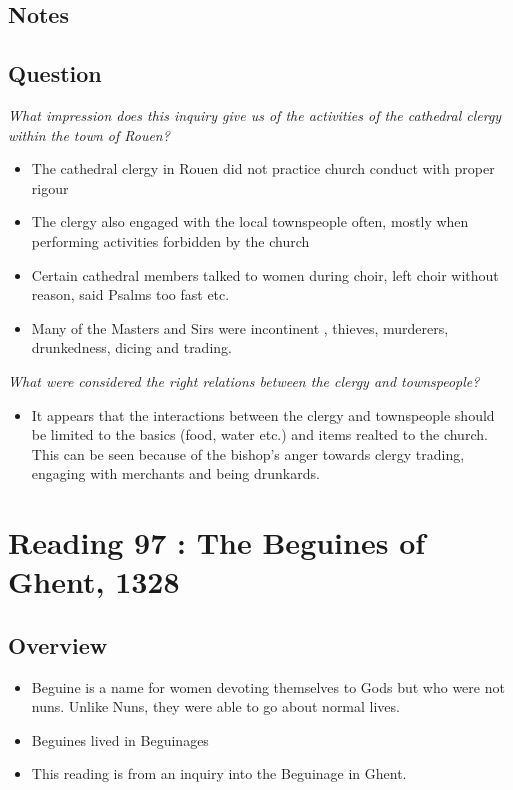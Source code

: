 \documentclass[12pt]{article}
\begin{document}
\subsection*{Notes}

\subsection*{Question}

\textit{What impression does this inquiry give us of the activities of the cathedral clergy within the town of Rouen?}

\begin{itemize}
	\item The cathedral clergy in Rouen did not practice church conduct with proper rigour
	\item The clergy also engaged with the local townspeople often, mostly when performing activities forbidden by the church
	\item Certain cathedral members talked to women during choir, left choir without reason, said Psalms too fast etc.
	\item Many of the Masters and Sirs were incontinent , thieves, murderers, drunkedness, dicing and trading. 
\end{itemize}

\textit{What were considered the right relations between the clergy and townspeople?}
\begin{itemize}
	\item It appears that the interactions between the clergy and townspeople should be limited to the basics (food, water etc.) and items realted to the church. This can be seen because of the bishop's anger towards clergy trading, engaging with merchants and being drunkards.
\end{itemize}

\section*{Reading 97 : The Beguines of Ghent, 1328}

\subsection*{Overview}
\begin{itemize}
	\item Beguine is a name for women devoting themselves to Gods but who were not nuns. Unlike Nuns, they were able to go about normal lives.
	\item Beguines lived in Beguinages
	\item This reading is from an inquiry into the Beguinage in Ghent.
\end{itemize}
\end{document}
